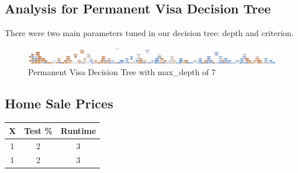 \documentclass[h]{article}
\begin{document}
\subsection*{Analysis for Permanent Visa Decision Tree}
There were two main parameters tuned in our decision tree: depth and criterion.

\begin{figure}[H]
    \includegraphics[width=1.0\textwidth,keepaspectratio]{1_dtree.jpg} 
    \caption*{Permanent Visa Decision Tree with max\_depth of 7} 
\end{figure}

\subsection*{Home Sale Prices}
\begin{tabular}{ | c | c | c  | } 
\hline
\textbf{X} & \textbf{Test \%} & \textbf{Runtime}  \\
\hline
1 & 2 & 3 \\ \hline
1 & 2 & 3 \\ \hline
\end{tabular}
\end{document}
